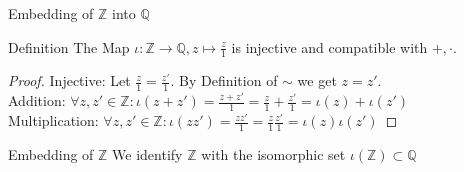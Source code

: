 \documentclass[aspectratio=169]{beamer}
\begin{document}
\begin{frame}{Embedding of $\mathbb{Z}$ into $\mathbb{Q}$}
    \begin{block}{Definition}
        The Map $\iota: \mathbb{Z} \rightarrow \mathbb{Q}, z \mapsto \frac{z}{1}$ is injective and compatible with $+, \cdot$.
    \end{block}

    \begin{proof}
        Injective: Let $\frac{z}{1} = \frac{z'}{1}$. By Definition of $\sim$ we get $z=z'$.\\
        Addition: $\forall z, z' \in \mathbb{Z}: \iota(z+z')=\frac{z+z'}{1}=\frac{z}{1}+\frac{z'}{1}=\iota(z)+\iota(z')$\\
        Multiplication: $\forall z, z' \in \mathbb{Z}: \iota(zz') = \frac{zz'}{1}= \frac{z}{1}\frac{z'}{1}= \iota(z)\iota(z')$
    \end{proof}

    \begin{block}{Embedding of $\mathbb{Z}$}
        We identify $\mathbb{Z}$ with the isomorphic set $\iota(\mathbb{Z}) \subset \mathbb{Q}$
    \end{block}
\end{frame}
\end{document}
